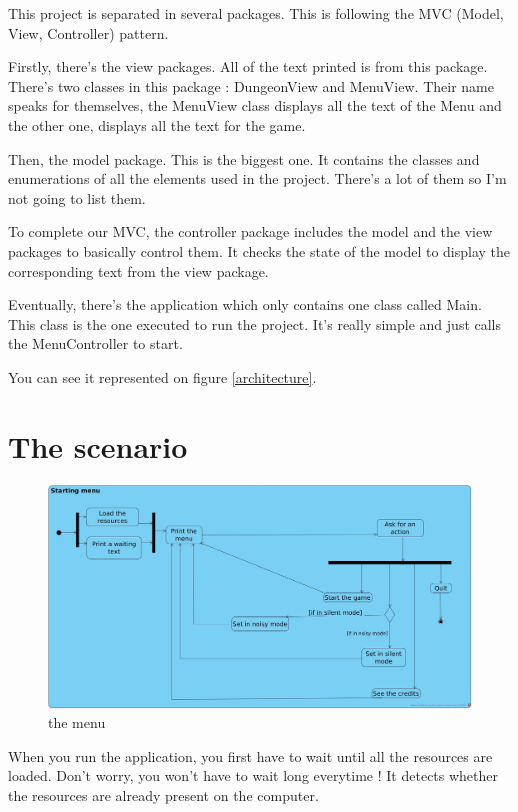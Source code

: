 \documentclass[11pt]{extarticle}
\begin{document}
This project is separated in several packages. This is following the MVC (Model, View, Controller) pattern. 

Firstly, there's the view packages. All of the text printed is from this package. There's two classes in this package : DungeonView and MenuView. Their name speaks for themselves, the MenuView class displays all the text of the Menu and the other one, displays all the text for the game.

Then, the model package. This is the biggest one. It contains the classes and enumerations of all the elements used in the project. There's a lot of them so I'm not going to list them.

To complete our MVC, the controller package includes the model and the view packages to basically control them. It checks the state of the model to display the corresponding text from the view package.

Eventually, there's the application which only contains one class called Main. This class is the one executed to run the project. It's really simple and just calls the MenuController to start.

You can see it represented on figure \ref{architecture}.

\section{The scenario}

\begin{figure}[hb]
    \centering
    
    \caption{the menu}
    \label{menu}
    \includegraphics[scale = 0.198]{menu}
\end{figure}

When you run the application, you first have to wait until all the resources are loaded. Don't worry, you won't have to wait long everytime ! It detects whether the resources are already present on the computer. 
\end{document}

